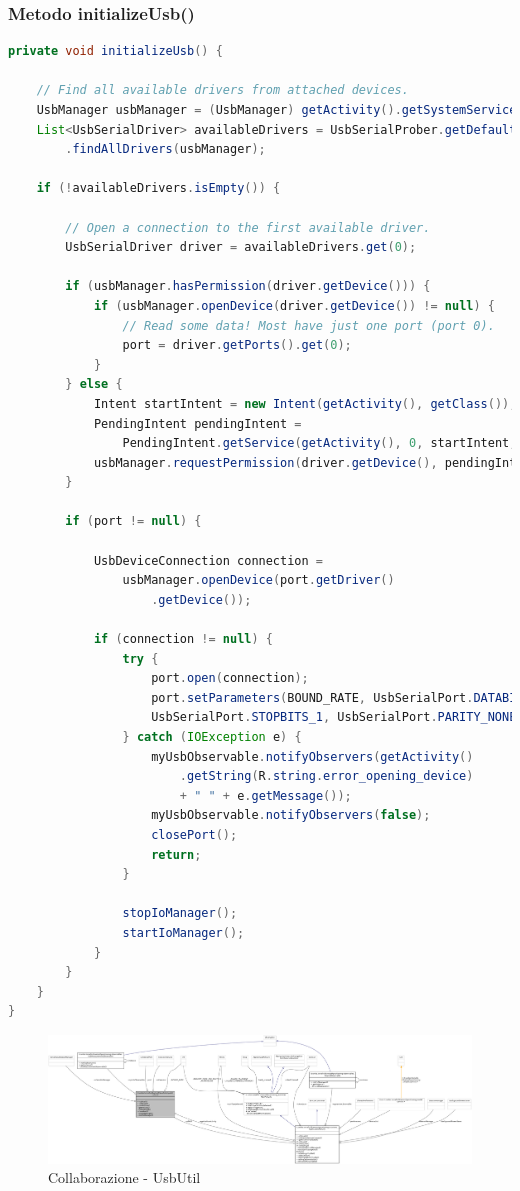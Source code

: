 \subsubsection{Metodo initializeUsb()}
\begin{lstlisting}[language=Java]
private void initializeUsb() {
	
	// Find all available drivers from attached devices.
	UsbManager usbManager = (UsbManager) getActivity().getSystemService(Context.USB_SERVICE);
	List<UsbSerialDriver> availableDrivers = UsbSerialProber.getDefaultProber()
		.findAllDrivers(usbManager);
		
	if (!availableDrivers.isEmpty()) {
		
		// Open a connection to the first available driver.
		UsbSerialDriver driver = availableDrivers.get(0);
		
		if (usbManager.hasPermission(driver.getDevice())) {
			if (usbManager.openDevice(driver.getDevice()) != null) {
				// Read some data! Most have just one port (port 0).
				port = driver.getPorts().get(0);
			}
		} else {
			Intent startIntent = new Intent(getActivity(), getClass());
			PendingIntent pendingIntent =
				PendingIntent.getService(getActivity(), 0, startIntent, 0);
			usbManager.requestPermission(driver.getDevice(), pendingIntent);
		}
		
		if (port != null) {
			
			UsbDeviceConnection connection = 
				usbManager.openDevice(port.getDriver()
					.getDevice());
			
			if (connection != null) {
				try {
					port.open(connection);
					port.setParameters(BOUND_RATE, UsbSerialPort.DATABITS_8,
					UsbSerialPort.STOPBITS_1, UsbSerialPort.PARITY_NONE);
				} catch (IOException e) {
					myUsbObservable.notifyObservers(getActivity()
						.getString(R.string.error_opening_device)
						+ " " + e.getMessage());
					myUsbObservable.notifyObservers(false);
					closePort();
					return;
				}
				
				stopIoManager();
				startIoManager();
			}
		}
	}
}
\end{lstlisting}

\begin{figure}[ph]
	\centering
	\includegraphics[width=1.85\linewidth,angle=90]{img/uml/class/classit_1_1unibo_1_1torsello_1_1bluetoothpositioning_1_1util_1_1UsbUtil__coll__graph.png}
	\caption{Collaborazione - UsbUtil}
\end{figure}

